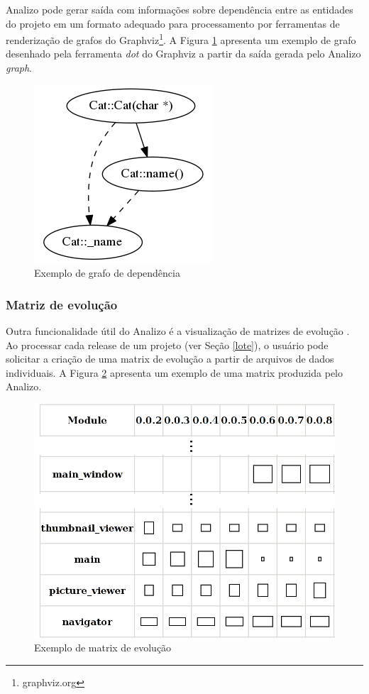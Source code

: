 Analizo pode gerar saída com informações sobre dependência entre as entidades
do projeto em um formato adequado para processamento por ferramentas de
renderização de grafos do Graphviz\footnote{graphviz.org}. A Figura
\ref{sample-graph} apresenta um exemplo de grafo desenhado pela ferramenta {\it
dot} do Graphviz a partir da saída gerada pelo Analizo {\it graph}.

\begin{figure}[h]
\center
\includegraphics[scale=0.4]{imagens/sample-graph.png}
\caption{Exemplo de grafo de dependência}
\label{sample-graph}
\end{figure}

\subsubsection{Matriz de evolução}

Outra funcionalidade útil do Analizo é a visualização de matrizes de evolução
\cite{Lanza2001}. Ao processar cada release de um projeto (ver Seção
\ref{lote}), o usuário pode solicitar a criação de uma matrix de evolução a
partir de arquivos de dados individuais. A Figura \ref{sample-evolution-matrix}
apresenta um exemplo de uma matrix produzida pelo Analizo.

\begin{figure}[h]
\center
\includegraphics[scale=0.2]{imagens/sample-evolution-matrix.png}
\caption{Exemplo de matrix de evolução}
\label{sample-evolution-matrix}
\end{figure}

